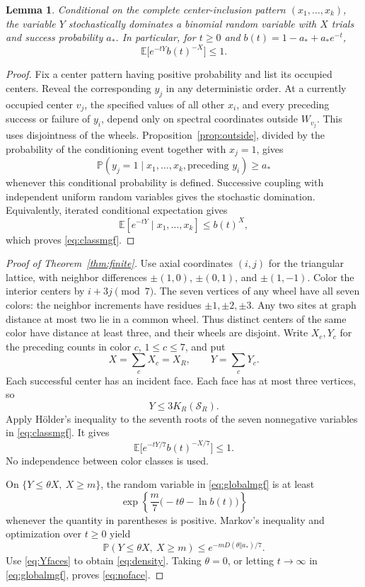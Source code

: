 \documentclass[11pt]{amsart}
\newtheorem{lemma}[theorem]{Lemma}
\theoremstyle{remark}
\newcommand{\Prob}{\mathbb P}
\newcommand{\E}{\mathbb E}
\newcommand{\cS}{\mathcal S}
\newcommand{\astar}{a_*}
\begin{document}
\begin{lemma}\label{lem:bernoulli}
Conditional on the complete center-inclusion pattern $(x_1,\ldots,x_k)$, the variable $Y$ stochastically dominates a binomial random variable with $X$ trials and success probability $\astar$. In particular, for $t\ge0$ and $b(t)=1-\astar+\astar e^{-t}$,
\begin{equation}\label{eq:classmgf}
 \E\bigl[e^{-tY}b(t)^{-X}\bigr]\le1.
\end{equation}
\end{lemma}
\begin{proof}
Fix a center pattern having positive probability and list its occupied centers. Reveal the corresponding $y_j$ in any deterministic order. At a currently occupied center $v_j$, the specified values of all other $x_i$, and every preceding success or failure of $y_i$, depend only on spectral coordinates outside $W_{v_j}$. This uses disjointness of the wheels. Proposition~\ref{prop:outside}, divided by the probability of the conditioning event together with $x_j=1$, gives
\[
 \Prob(y_j=1\mid x_1,\ldots,x_k,\text{preceding }y_i)\ge\astar
\]
whenever this conditional probability is defined. Successive coupling with independent uniform random variables gives the stochastic domination. Equivalently, iterated conditional expectation gives
\[
 \E[e^{-tY}\mid x_1,\ldots,x_k]\le b(t)^X,
\]
which proves \eqref{eq:classmgf}.
\end{proof}

\begin{proof}[Proof of Theorem~\ref{thm:finite}]
Use axial coordinates $(i,j)$ for the triangular lattice, with neighbor differences $\pm(1,0)$, $\pm(0,1)$, and $\pm(1,-1)$. Color the interior centers by $i+3j\pmod7$. The seven vertices of any wheel have all seven colors: the neighbor increments have residues $\pm1,\pm2,\pm3$. Any two sites at graph distance at most two lie in a common wheel. Thus distinct centers of the same color have distance at least three, and their wheels are disjoint. Write $X_c,Y_c$ for the preceding counts in color $c$, $1\le c\le7$, and put
\[
 X=\sum_cX_c=X_R,\qquad Y=\sum_cY_c.
\]
Each successful center has an incident face. Each face has at most three vertices, so
\begin{equation}\label{eq:Yfaces}
 Y\le3K_R(\cS_R).
\end{equation}
Apply H\"older's inequality to the seventh roots of the seven nonnegative variables in \eqref{eq:classmgf}. It gives
\begin{equation}\label{eq:globalmgf}
 \E\bigl[e^{-tY/7}b(t)^{-X/7}\bigr]\le1.
\end{equation}
No independence between color classes is used.

On $\{Y\le\theta X,\ X\ge m\}$, the random variable in \eqref{eq:globalmgf} is at least
\[
 \exp\left\{\frac{m}{7}\bigl(-t\theta-\ln b(t)\bigr)\right\}
\]
whenever the quantity in parentheses is positive. Markov's inequality and optimization over $t\ge0$ yield
\[
 \Prob(Y\le\theta X,\ X\ge m)
 \le e^{-mD(\theta\Vert\astar)/7}.
\]
Use \eqref{eq:Yfaces} to obtain \eqref{eq:density}. Taking $\theta=0$, or letting $t\to\infty$ in \eqref{eq:globalmgf}, proves \eqref{eq:noface}.
\end{proof}
\end{document}
